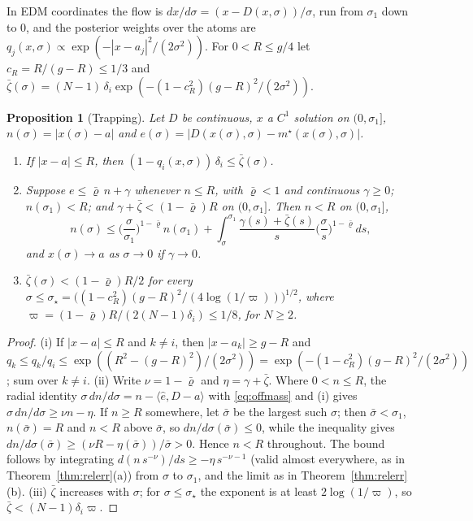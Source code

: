 \documentclass{article} %
\theoremstyle{plain}
\newtheorem{proposition}[theorem]{Proposition}
\theoremstyle{definition}
\theoremstyle{remark}
\begin{document}
In EDM coordinates the flow is $dx/d\sigma=(x-D(x,\sigma))/\sigma$, run from $\sigma_1$ down to $0$, and
the posterior weights over the atoms are
$q_j(x,\sigma)\propto\exp(-|x-a_j|^2/(2\sigma^2))$. For $0<R\le g/4$ let $c_R=R/(g-R)\le1/3$ and
$\bar\zeta(\sigma)=(N-1)\,\delta_i\exp(-(1-c_R^2)(g-R)^2/(2\sigma^2))$.

\begin{proposition}[Trapping]
\label{prop:trap}
Let $D$ be continuous, $x$ a $C^1$ solution on $(0,\sigma_1]$, $n(\sigma)=|x(\sigma)-a|$ and
$e(\sigma)=|D(x(\sigma),\sigma)-m^\star(x(\sigma),\sigma)|$.
\begin{enumerate}[label=(\roman*),leftmargin=2em]
\item If $|x-a|\le R$, then $(1-q_i(x,\sigma))\,\delta_i\le\bar\zeta(\sigma)$.
\item Suppose $e\le\bar\varrho\,n+\gamma$ whenever $n\le R$, with $\bar\varrho<1$ and continuous
  $\gamma\ge0$; $n(\sigma_1)<R$; and $\gamma+\bar\zeta<(1-\bar\varrho)R$ on $(0,\sigma_1]$. Then
  $n<R$ on $(0,\sigma_1]$,
  \[
  n(\sigma)\le\Big(\frac{\sigma}{\sigma_1}\Big)^{1-\bar\varrho}n(\sigma_1)
  +\int_\sigma^{\sigma_1}\frac{\gamma(s)+\bar\zeta(s)}{s}\Big(\frac{\sigma}{s}\Big)^{1-\bar\varrho}ds,
  \]
  and $x(\sigma)\to a$ as $\sigma\to0$ if $\gamma\to0$.
\item $\bar\zeta(\sigma)<(1-\bar\varrho)R/2$ for every
  $\sigma\le\sigma_\star=\big((1-c_R^2)(g-R)^2/(4\log(1/\varpi))\big)^{1/2}$, where
  $\varpi=(1-\bar\varrho)R/(2(N-1)\delta_i)\le1/8$, for $N\ge2$.
\end{enumerate}
\end{proposition}

\begin{proof}
(i) If $|x-a|\le R$ and $k\ne i$, then $|x-a_k|\ge g-R$ and
$q_k\le q_k/q_i\le\exp((R^2-(g-R)^2)/(2\sigma^2))=\exp(-(1-c_R^2)(g-R)^2/(2\sigma^2))$; sum over
$k\ne i$. (ii) Write $\nu=1-\bar\varrho$ and $\eta=\gamma+\bar\zeta$. Where $0<n\le R$, the radial identity
$\sigma\,dn/d\sigma=n-\langle\hat e,D-a\rangle$ with \eqref{eq:offmass} and (i) gives
$\sigma\,dn/d\sigma\ge\nu n-\eta$. If $n\ge R$ somewhere, let $\bar\sigma$ be the largest such
$\sigma$; then $\bar\sigma<\sigma_1$, $n(\bar\sigma)=R$ and $n<R$ above $\bar\sigma$, so
$dn/d\sigma(\bar\sigma)\le0$, while the inequality gives
$dn/d\sigma(\bar\sigma)\ge(\nu R-\eta(\bar\sigma))/\bar\sigma>0$. Hence $n<R$ throughout. The bound
follows by integrating $d(n\,s^{-\nu})/ds\ge-\eta\,s^{-\nu-1}$ (valid almost everywhere, as in
Theorem~\ref{thm:relerr}(a)) from $\sigma$ to $\sigma_1$, and the limit as in
Theorem~\ref{thm:relerr}(b). (iii) $\bar\zeta$ increases with $\sigma$; for $\sigma\le\sigma_\star$ the
exponent is at least $2\log(1/\varpi)$, so $\bar\zeta<(N-1)\delta_i\varpi$.
\end{proof}
\end{document}
